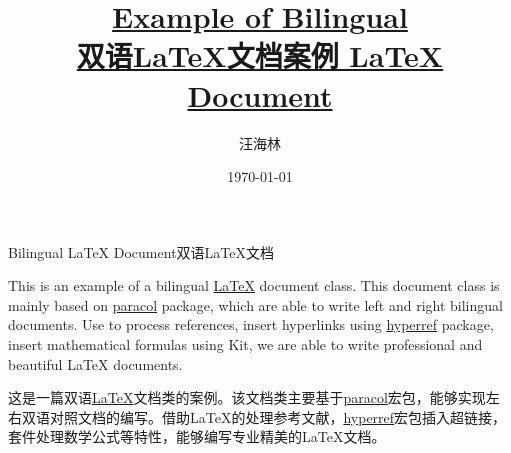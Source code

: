 \documentclass{bilidoc}
\title{\textbf{\href{https://github.com/wanghailin08/bilidoc}{Example of Bilingual\\双语\LaTeX{}文档案例 \LaTeX{} Document}}}
\author{汪海林}
\date{\today}
\begin{document}
\maketitle

\vspace{20mm}

\tableofcontents

\newpage

\begin{Abstract}{Bilingual \LaTeX{} Document}{双语\LaTeX{}文档}

    This is an example of a bilingual \href{https://www.latex-project.org/}{\LaTeX{}} document class. This document class is mainly based on \href{https://www.ctan.org/pkg/paracol}{paracol} package, which are able to write left and right bilingual documents. Use \href{http://www.bibtex.org/}{\BibTeX{}} to process references, insert hyperlinks using \href{https://www.ctan.org/pkg/hyperref}{hyperref} package, insert mathematical formulas using \href{https://www.ctan.org/pkg/amstex}{\AMSTeX} Kit, we are able to write professional and beautiful \LaTeX{} documents.

    \switchcolumn

    这是一篇双语\href{https://www.latex-project.org/}{\LaTeX{}}文档类的案例。该文档类主要基于\href{https://www.ctan.org/pkg/paracol}{paracol}宏包，能够实现左右双语对照文档的编写。借助\LaTeX{}的\href{http://www.bibtex.org/}{\BibTeX{}}处理参考文献，\href{https://www.ctan.org/pkg/hyperref}{hyperref}宏包插入超链接，\href{https://www.ctan.org/pkg/amstex}{\AMSTeX}套件处理数学公式等特性，能够编写专业精美的\LaTeX{}文档。


\end{Abstract}




\end{document}
